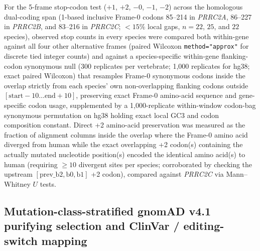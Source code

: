 \documentclass[10pt,letterpaper]{article}
\newcommand{\gene}[1]{\textit{#1}}
\begin{document}
For the 5-frame stop-codon test ($+1$, $+2$, $-0$, $-1$, $-2$) across the homologous dual-coding span (1-based inclusive Frame-0 codons 85--214 in \gene{PRRC2A}, 86--227 in \gene{PRRC2B}, and 83--216 in \gene{PRRC2C}; $< 15\%$ local gaps, $n = 22$, $25$, and $22$ species), observed stop counts in every species were compared both within-gene against all four other alternative frames (paired Wilcoxon \texttt{method="approx"} for discrete tied integer counts) and against a species-specific within-gene flanking-codon synonymous null (300 replicates per vertebrate; 1,000 replicates for hg38; exact paired Wilcoxon) that resamples Frame-0 synonymous codons inside the overlap strictly from each species' own non-overlapping flanking codons outside $[\text{start}-10\ldots\text{end}+10]$, preserving exact Frame-0 amino-acid sequence and gene-specific codon usage, supplemented by a 1,000-replicate within-window codon-bag synonymous permutation on hg38 holding exact local GC3 and codon composition constant. Direct +2 amino-acid preservation was measured as the fraction of alignment columns inside the overlap where the Frame-0 amino acid diverged from human while the exact overlapping +2 codon(s) containing the actually mutated nucleotide position(s) encoded the identical amino acid(s) to human (requiring $\ge 10$ divergent sites per species; corroborated by checking the upstream $[\text{prev\_b2}, \text{b0}, \text{b1}]$ +2 codon), compared against \gene{PRRC2C} via Mann--Whitney $U$ tests.

\subsection{Mutation-class-stratified gnomAD v4.1 purifying selection and ClinVar / editing-switch mapping}
\end{document}
